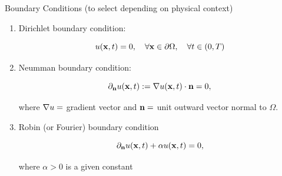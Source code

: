 \begin{frame}{Boundary Conditions {\small (to select depending on physical context)}}
  \begin{enumerate}
  \item \alert{Dirichlet} boundary condition:
    \begin{BlockNoTitle}
      \begin{equation*}
        u(\mathbf{x},t)=0, \quad \forall \mathbf{x}\in\partial\Omega, \quad \forall t\in(0,T)
      \end{equation*}
    \end{BlockNoTitle}
  \item \alert{Neumman} boundary condition:
    \begin{BlockNoTitle}
      \begin{equation*}
        \partial_{\mathbf{n}} u(\mathbf{x},t) := \nabla u(\mathbf{x},t)\cdot\mathbf{n} = 0,
      \end{equation*}
    \end{BlockNoTitle}
    {\small\hfill
     where $\nabla u =$ gradient vector and $\mathbf{n}=$ unit outward vector normal to $\Omega$.}
    \smallskip
  \item \alert{Robin} (or Fourier) boundary condition
    \begin{BlockNoTitle}
      \begin{equation*}
        \partial_{\mathbf{n}} u(\mathbf{x},t) + \alpha u(\mathbf{x},t) = 0,
      \end{equation*}
    \end{BlockNoTitle}
    {\small\hfill where $\alpha>0$ is a given constant}
  \end{enumerate}
\end{frame}

